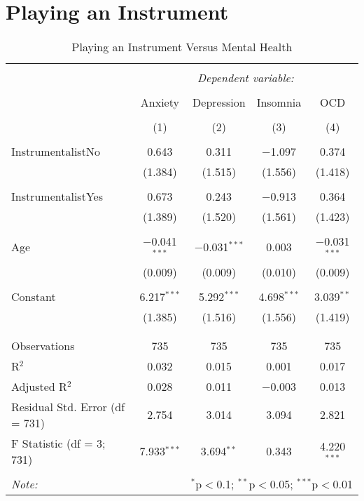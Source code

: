 \documentclass{article}
\begin{document}
\newpage

\section{Playing an Instrument}

\begin{table}[!htbp] \centering 
  \caption{Playing an Instrument Versus Mental Health} 
  \label{} 
\begin{tabular}{@{\extracolsep{5pt}}lcccc} 
\\[-1.8ex]\hline 
\hline \\[-1.8ex] 
 & \multicolumn{4}{c}{\textit{Dependent variable:}} \\ 
\cline{2-5} 
\\[-1.8ex] & Anxiety & Depression & Insomnia & OCD \\ 
\\[-1.8ex] & (1) & (2) & (3) & (4)\\ 
\hline \\[-1.8ex] 
 InstrumentalistNo & 0.643 & 0.311 & $-$1.097 & 0.374 \\ 
  & (1.384) & (1.515) & (1.556) & (1.418) \\ 
  & & & & \\ 
 InstrumentalistYes & 0.673 & 0.243 & $-$0.913 & 0.364 \\ 
  & (1.389) & (1.520) & (1.561) & (1.423) \\ 
  & & & & \\ 
 Age & $-$0.041$^{***}$ & $-$0.031$^{***}$ & 0.003 & $-$0.031$^{***}$ \\ 
  & (0.009) & (0.009) & (0.010) & (0.009) \\ 
  & & & & \\ 
 Constant & 6.217$^{***}$ & 5.292$^{***}$ & 4.698$^{***}$ & 3.039$^{**}$ \\ 
  & (1.385) & (1.516) & (1.556) & (1.419) \\ 
  & & & & \\ 
\hline \\[-1.8ex] 
Observations & 735 & 735 & 735 & 735 \\ 
R$^{2}$ & 0.032 & 0.015 & 0.001 & 0.017 \\ 
Adjusted R$^{2}$ & 0.028 & 0.011 & $-$0.003 & 0.013 \\ 
Residual Std. Error (df = 731) & 2.754 & 3.014 & 3.094 & 2.821 \\ 
F Statistic (df = 3; 731) & 7.933$^{***}$ & 3.694$^{**}$ & 0.343 & 4.220$^{***}$ \\ 
\hline 
\hline \\[-1.8ex] 
\textit{Note:}  & \multicolumn{4}{r}{$^{*}$p$<$0.1; $^{**}$p$<$0.05; $^{***}$p$<$0.01} \\ 
\end{tabular} 
\end{table} 
\end{document}
